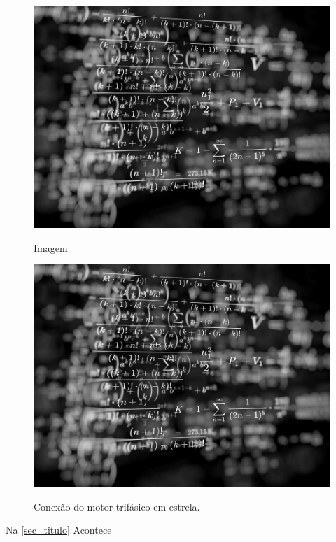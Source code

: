 \documentclass[twocolumn]{article}
\begin{document}
\begin{figure}[!htb]
	\centering\includegraphics[width=\columnwidth]{Figuras/imagem}\\
	\caption{Imagem}\label{im}
\end{figure}

\lipsum[5]

\begin{figure}[!htb]
	\centering\includegraphics[width=\columnwidth]{Figuras/imagem}\\
	\caption{Conexão do motor trifásico em estrela. }\label{triangulo}
\end{figure}

Na \ref{sec_titulo} Acontece


\begin{thebibliography}{refs}
\bibitem{}

\end{thebibliography}
\end{document}
